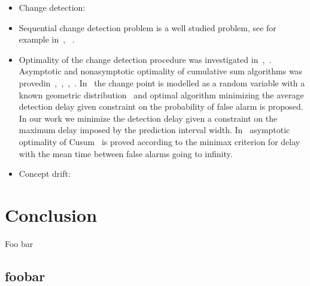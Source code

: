 \documentclass[licentiate,utf8,lot,loar,lof,shortloft,index]{jydiss}
\begin{document}
\begin{itemize}
  \item Change detection:~\cite{basseville1993detection}
  \item Sequential change detection problem is a well studied problem, see for example in~\cite{tartakovsky2014sequential}, ~\cite{plasse2021streaming}. 

  \item Optimality of the change detection procedure was investigated in~\cite{Page1954},~\cite{Shiryaev2010,Shiryaev1961,Shiryaev1963}.
  Asymptotic and nonasymptotic optimality of cumulative sum algorithms was provedin~\cite{lorden1971procedures},~\cite{moustakides1986optimal},~\cite{moustakides2004optimality},~\cite{ritov1990decision}. In~\cite{Shiryaev1963,shiryaev2007optimal} the change point is modelled as a random variable with a known geometric distribution~\cite{veeravalli2014quickest} and optimal algorithm minimizing the average detection delay given constraint on the probability of false alarm is proposed. In our work we minimize the detection delay given a constraint on the maximum delay imposed by the prediction interval width. In~\cite{lorden1971procedures} asymptotic optimality of Cusum~\cite{Page1954} is proved according to the minimax criterion for delay with the mean time between false alarms going to infinity.

  \item Concept drift:
\end{itemize}

\chapter{Conclusion}

\tailmatter
\finnishsummary
Foo bar


\appendices
{}
\section{foobar}

\backmatter


\printindex
\end{document}
